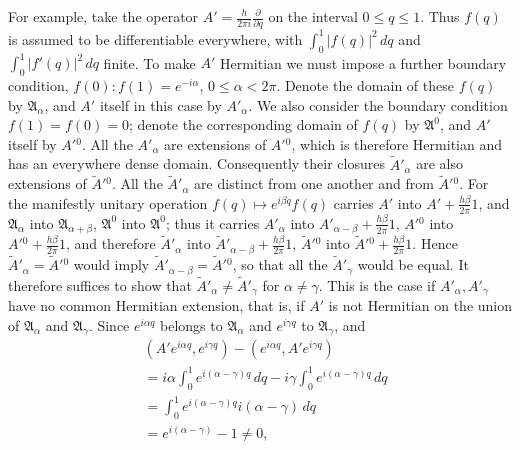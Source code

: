 \documentclass[fontsize=13pt,twoside,openany,headings=normal,parskip=false,bookmarkpackage=false,DIV=calc]{scrbook}
\begin{document}
\hypertarget{origpage-79}{}%
For example, take the operator $A'=\frac{h}{2\pi i}\frac{\partial}{\partial q}$ on the interval $0\leq q\leq1$. Thus $f(q)$ is assumed to be differentiable everywhere, with $\int_0^1|f(q)|^2\,dq$ and $\int_0^1|f'(q)|^2\,dq$ finite. To make $A'$ Hermitian we must impose a further boundary condition, $f(0):f(1)=e^{-i\alpha}$, $0\leq\alpha<2\pi$. Denote the domain of these $f(q)$ by $\mathfrak A_\alpha$, and $A'$ itself in this case by $A'_\alpha$. We also consider the boundary condition $f(1)=f(0)=0$; denote the corresponding domain of $f(q)$ by $\mathfrak A^0$, and $A'$ itself by $A'{}^0$. All the $A'_\alpha$ are extensions of $A'{}^0$, which is therefore Hermitian and has an everywhere dense domain. Consequently their closures $\widetilde A'_\alpha$ are also extensions of $\widetilde A'{}^0$. All the $\widetilde A'_\alpha$ are distinct from one another and from $\widetilde A'{}^0$. For the manifestly unitary operation $f(q)\mapsto e^{i\beta q}f(q)$ carries $A'$ into $A'+\frac{h\beta}{2\pi}1$, and $\mathfrak A_\alpha$ into $\mathfrak A_{\alpha+\beta}$, $\mathfrak A^0$ into $\mathfrak A^0$; thus it carries $A'_\alpha$ into $A'_{\alpha-\beta}+\frac{h\beta}{2\pi}1$, $A'{}^0$ into $A'{}^0+\frac{h\beta}{2\pi}1$, and therefore $\widetilde A'_\alpha$ into $\widetilde A'_{\alpha-\beta}+\frac{h\beta}{2\pi}1$, $\widetilde A'{}^0$ into $\widetilde A'{}^0+\frac{h\beta}{2\pi}1$. Hence $\widetilde A'_\alpha=\widetilde A'{}^0$ would imply $\widetilde A'_{\alpha-\beta}=\widetilde A'{}^0$, so that all the $\widetilde A'_\gamma$ would be equal. It therefore suffices to show that $\widetilde A'_\alpha\ne\widetilde A'_\gamma$ for $\alpha\ne\gamma$. This is the case if $A'_\alpha,A'_\gamma$ have no common Hermitian extension, that is, if $A'$ is not Hermitian on the union of $\mathfrak A_\alpha$ and $\mathfrak A_\gamma$. Since $e^{i\alpha q}$ belongs to $\mathfrak A_\alpha$ and $e^{i\gamma q}$ to $\mathfrak A_\gamma$, and
\begin{align*}
&(A'e^{i\alpha q},e^{i\gamma q})-(e^{i\alpha q},A'e^{i\gamma q})\\
&=i\alpha\int_0^1e^{i(\alpha-\gamma)q}\,dq-i\gamma\int_0^1e^{i(\alpha-\gamma)q}\,dq\\
&=\int_0^1e^{i(\alpha-\gamma)q}i(\alpha-\gamma)\,dq\\
&=e^{i(\alpha-\gamma)}-1\ne0,
\end{align*}
\end{document}
